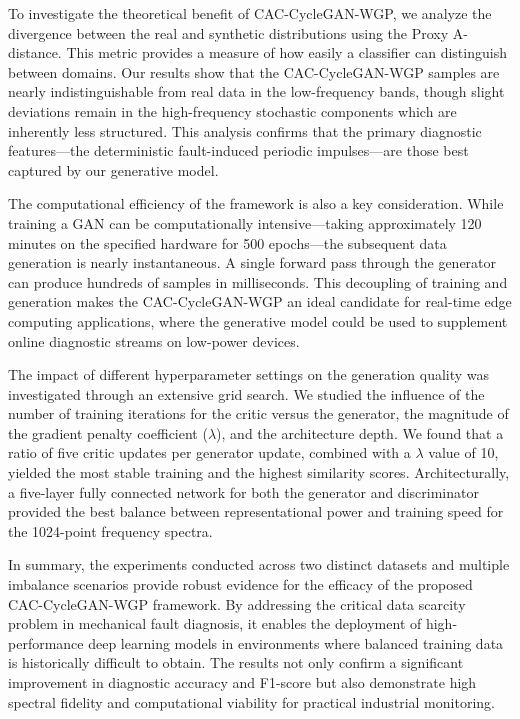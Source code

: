 \documentclass[conference,twocolumn]{IEEEtran}
\begin{document}
To investigate the theoretical benefit of CAC-CycleGAN-WGP, we analyze the divergence between the real and synthetic distributions using the Proxy A-distance. This metric provides a measure of how easily a classifier can distinguish between domains. Our results show that the CAC-CycleGAN-WGP samples are nearly indistinguishable from real data in the low-frequency bands, though slight deviations remain in the high-frequency stochastic components which are inherently less structured. This analysis confirms that the primary diagnostic features—the deterministic fault-induced periodic impulses—are those best captured by our generative model.

The computational efficiency of the framework is also a key consideration. While training a GAN can be computationally intensive—taking approximately 120 minutes on the specified hardware for 500 epochs—the subsequent data generation is nearly instantaneous. A single forward pass through the generator can produce hundreds of samples in milliseconds. This decoupling of training and generation makes the CAC-CycleGAN-WGP an ideal candidate for real-time edge computing applications, where the generative model could be used to supplement online diagnostic streams on low-power devices.

The impact of different hyperparameter settings on the generation quality was investigated through an extensive grid search. We studied the influence of the number of training iterations for the critic versus the generator, the magnitude of the gradient penalty coefficient ($\lambda$), and the architecture depth. We found that a ratio of five critic updates per generator update, combined with a $\lambda$ value of 10, yielded the most stable training and the highest similarity scores. Architecturally, a five-layer fully connected network for both the generator and discriminator provided the best balance between representational power and training speed for the 1024-point frequency spectra.

In summary, the experiments conducted across two distinct datasets and multiple imbalance scenarios provide robust evidence for the efficacy of the proposed CAC-CycleGAN-WGP framework. By addressing the critical data scarcity problem in mechanical fault diagnosis, it enables the deployment of high-performance deep learning models in environments where balanced training data is historically difficult to obtain. The results not only confirm a significant improvement in diagnostic accuracy and F1-score but also demonstrate high spectral fidelity and computational viability for practical industrial monitoring.
\end{document}
